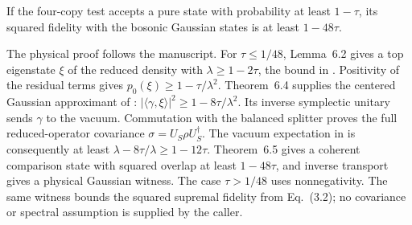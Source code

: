 \begin{theorem}\label{thm:main-boson}
  \par
  \leanok
  If the four-copy test accepts a pure state with probability at least
  $1-\tau$, its squared fidelity with the bosonic Gaussian states is at least
  $1-48\tau$.

  The physical proof follows the manuscript. For $\tau\le1/48$, Lemma~6.2
  gives a top eigenstate $\xi$ of the reduced density with
  $\lambda\ge1-2\tau$, the bound in .
  Positivity of the residual terms gives $p_0(\xi)\ge1-\tau/\lambda^2$.
  Theorem~6.4 supplies the centered Gaussian approximant of
  :
  $|\langle\gamma,\xi\rangle|^2\ge1-8\tau/\lambda^2$.
  Its inverse symplectic unitary sends $\gamma$ to the vacuum.
  Commutation with the balanced splitter proves the full reduced-operator
  covariance $\sigma=U_S\rho U_S^\dagger$. The vacuum expectation in
   is consequently at least
  $\lambda-8\tau/\lambda\ge1-12\tau$.
  Theorem~6.5 gives a coherent comparison state with squared overlap at least
  $1-48\tau$, and inverse transport gives a physical Gaussian witness.
  The case $\tau>1/48$ uses nonnegativity. The same witness bounds the
  squared supremal fidelity from Eq.~(3.2); no covariance or spectral
  assumption is supplied by the caller.
\end{theorem}

